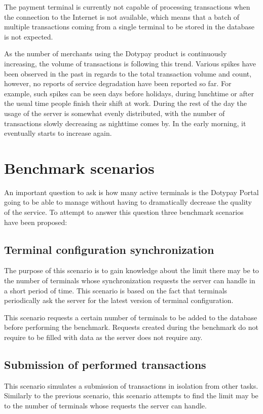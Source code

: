 \documentclass[12pt, a4paper]{article}
\let\oldsection\section
\renewcommand\section{\clearpage\oldsection}
\begin{document}
The payment terminal is currently not capable of processing transactions when the connection to the Internet is not available, which means that a batch of multiple transactions coming from a single terminal to be stored in the database is not expected. 

As the number of merchants using the Dotypay product is continuously increasing, the volume of transactions is following this trend.
Various spikes have been observed in the past in regards to the total transaction volume and count, however, no reports of service degradation have been reported so far.
For example, such spikes can be seen days before holidays, during lunchtime or after the usual time people finish their shift at work. During the rest of the day the usage of the server is somewhat evenly distributed, with the number of transactions slowly decreasing as nighttime comes by. 
In the early morning, it eventually starts to increase again.

\section{Benchmark scenarios}

An important question to ask is how many active terminals is the Dotypay Portal going to be able to manage without having to dramatically decrease the quality of the service. To attempt to answer this question three benchmark scenarios have been proposed:


\subsection{Terminal configuration synchronization}
The purpose of this scenario is to gain knowledge about the limit there may be to the number of terminals whose synchronization requests the server can handle in a short period of time. This scenario is based on the fact that terminals periodically ask the server for the latest version of terminal configuration. 

This scenario requests a certain number of terminals to be added to the database before performing the benchmark.
Requests created during the benchmark do not require to be filled with data as the server does not require any. 

\subsection{Submission of performed transactions}
This scenario simulates a submission of transactions in isolation from other tasks. Similarly to the previous scenario, this scenario attempts to find the limit may be to the number of terminals whose requests the server can handle.
\end{document}
